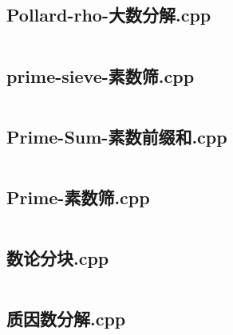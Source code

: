 \documentclass[a4paper,landscape,twocolumn]{article} %
\begin{document}
\subsection{Pollard-rho-大数分解.cpp}
\inputminted{c++}{./codes/030}
\subsection{prime-sieve-素数筛.cpp}
\inputminted{c++}{./codes/031}
\subsection{Prime-Sum-素数前缀和.cpp}
\inputminted{c++}{./codes/032}
\subsection{Prime-素数筛.cpp}
\inputminted{c++}{./codes/033}
\subsection{数论分块.cpp}
\inputminted{c++}{./codes/034}
\subsection{质因数分解.cpp}
\inputminted{c++}{./codes/035}
\end{document}
